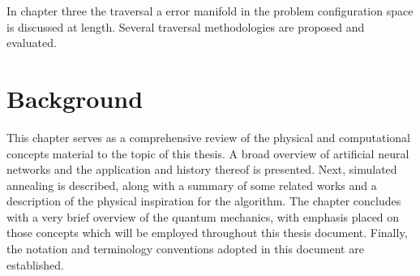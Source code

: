 \documentclass[11pt]{afthesis}
\begin{document}
	
	
	In chapter three the traversal a error manifold in the problem configuration space is discussed at length. Several traversal methodologies are proposed and evaluated. 
	
	
	
	\chapter{Background} %
	
	This chapter serves as a comprehensive review of the physical and computational concepts material to the topic of this thesis. A broad overview of artificial neural networks and the application and history thereof is presented. Next, simulated annealing is described, along with a summary of some related works and a description of the physical inspiration for the algorithm. The chapter concludes with a very brief overview of the quantum mechanics, with emphasis placed on those concepts which will be employed throughout this thesis document. Finally, the notation and terminology conventions adopted in this document are established.
	
\end{document}

